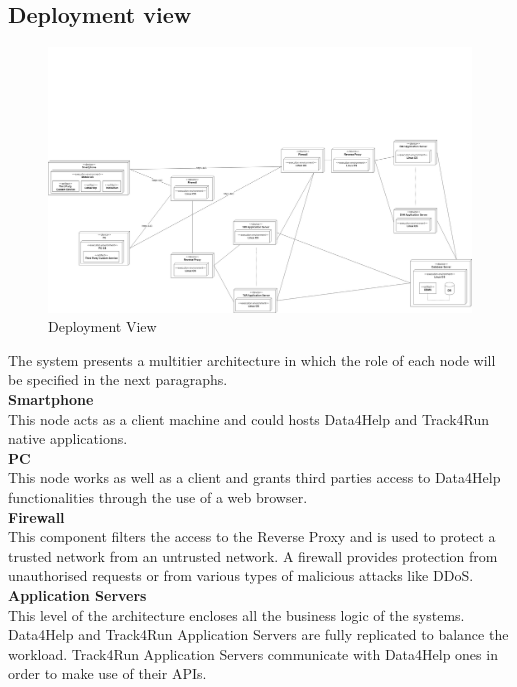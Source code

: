 \documentclass[titlepage]{article}
\begin{document}
\pagebreak

\subsection{Deployment view}

\begin{figure}[H]
	\center
  	\includegraphics[width=15cm]{Deployment.png}
  	\caption{Deployment View}
 	\label{fig:DEPVIEW}
\end{figure}
The system presents a multitier architecture in which the role of each node will be specified in the next paragraphs. \\

{\bf Smartphone }\\ 
This node acts as a client machine and could hosts Data4Help and Track4Run native applications. \\

{\bf PC }\\ 
This node works as well as a client and grants third parties access to Data4Help functionalities through the use of a web browser.\\

{\bf Firewall }\\ 
This component filters the access to the Reverse Proxy and is used to protect a trusted network from an untrusted network. A firewall provides protection from unauthorised requests or from various types of malicious attacks like DDoS.\\

{\bf Application Servers }\\ 
This level of the architecture encloses all the business logic of the systems. Data4Help and Track4Run Application Servers are fully replicated to balance the workload. Track4Run Application Servers communicate with Data4Help ones in order to make use of their APIs.\\
\end{document}
